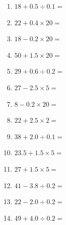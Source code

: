 \documentclass[12pt]{article}
\begin{document}
\begin{enumerate}
\item \large $ 18 + 0.5 \div 0.1 = $ \vspace{1.6cm}
\item \large $ 22 + 0.4 \times 20 = $ \vspace{1.6cm}
\item \large $ 18 - 0.2 \times 20 = $ \vspace{1.6cm}
\item \large $ 50 + 1.5 \times 20 = $ \vspace{1.6cm}
\newpage
\item \large $ 29 + 0.6 \div 0.2 = $ \vspace{1.6cm}
\item \large $ 27 - 2.5 \times 5 = $ \vspace{1.6cm}
\item \large $ 8 - 0.2 \times 20 = $ \vspace{1.6cm}
\item \large $ 22 + 2.5 \times 2 = $ \vspace{1.6cm}
\item \large $ 38 + 2.0 \div 0.1 = $ \vspace{1.6cm}
\item \large $ 23.5 + 1.5 \times 5 = $ \vspace{1.6cm}
\item \large $ 27 + 1.5 \times 5 = $ \vspace{1.6cm}
\item \large $ 41 - 3.8 \div 0.2 = $ \vspace{1.6cm}
\item \large $ 22 - 2.0 \div 0.2 = $ \vspace{1.6cm}
\item \large $ 49 + 4.0 \div 0.2 = $ \vspace{1.6cm}
\end{enumerate}
\newpage
\end{document}

